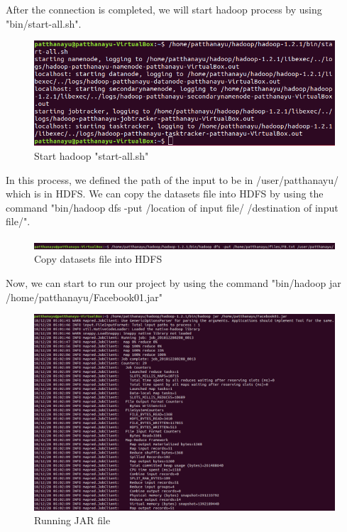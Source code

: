 \documentclass[11pt]{article}
\begin{document}
\newpage
After the connection is completed, we will start hadoop process by using "bin/start-all.sh".

\begin{figure}[h]
\centering
\includegraphics[scale=0.7]{in5}
\caption{Start hadoop "start-all.sh"}
\end{figure}

In this process, we defined the path of the input to be in /user/patthanayu/ which is in HDFS. We can copy the datasets file into HDFS by using the command "bin/hadoop dfs -put /location of input file/  /destination of input file/".

\begin{figure}[h]
\centering
\includegraphics[scale=0.55]{in00}
\caption{Copy datasets file into HDFS}
\end{figure}

\newpage
Now, we can start to run our project by using the command "bin/hadoop jar /home/patthanayu/Facebook01.jar"

\begin{figure}[h]
\centering
\includegraphics[scale=0.5]{in1}
\caption{Running JAR file}
\end{figure}
\end{document}
